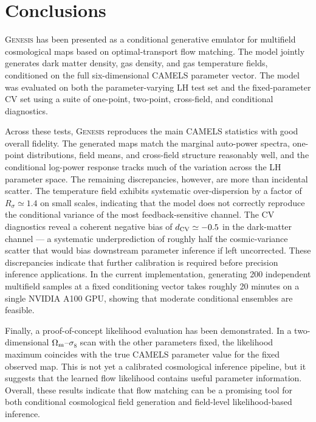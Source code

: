 \documentclass{article}
\newcommand{\Om}{\Omega_{\rm m}}
\newcommand{\sig}{\sigma_8}
\begin{document}
\section{Conclusions}
\label{sec:conclusions}

\textsc{Genesis} has been presented as a conditional generative emulator
for multifield cosmological maps based on optimal-transport flow
matching. The model jointly generates dark matter density,
gas density, and gas temperature fields, conditioned on the full
six-dimensional CAMELS parameter vector. The model was evaluated on
both the parameter-varying LH test set and the fixed-parameter CV set
using a suite of one-point, two-point, cross-field, and conditional
diagnostics.

Across these tests, \textsc{Genesis} reproduces the main CAMELS
statistics with good overall fidelity. The generated maps match the marginal
auto-power spectra, one-point distributions, field means, and
cross-field structure reasonably well, and the conditional log-power
response tracks much of the variation across the LH parameter space.
The remaining discrepancies, however, are more than incidental scatter.
The temperature field exhibits systematic over-dispersion by a factor of
$R_\sigma \simeq 1.4$ on small scales, indicating that the model does not
correctly reproduce the conditional variance of the most
feedback-sensitive channel. The CV diagnostics reveal a coherent negative
bias of $d_{\rm CV}\simeq -0.5$ in the dark-matter channel --- a
systematic underprediction of roughly half the cosmic-variance scatter
that would bias downstream parameter inference if left uncorrected.
These discrepancies indicate that further calibration is required
before precision inference applications. In the current implementation,
generating 200 independent multifield samples at a fixed conditioning
vector takes roughly 20 minutes on a single NVIDIA A100 GPU, showing
that moderate conditional ensembles are feasible.

Finally, a proof-of-concept likelihood evaluation has been demonstrated.
In a two-dimensional $\Om$--$\sig$ scan with the other parameters fixed,
the likelihood maximum coincides with the true CAMELS parameter value
for the fixed observed map. This is not yet a calibrated cosmological
inference pipeline, but it suggests that the learned flow likelihood
contains useful parameter information. Overall, these results indicate
that flow matching can be a promising tool for both conditional
cosmological field generation and field-level likelihood-based
inference.
\end{document}
